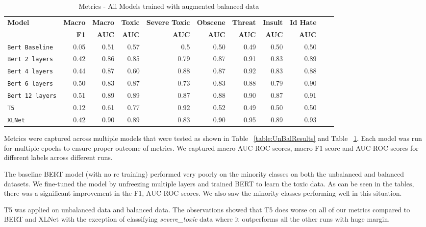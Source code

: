 \documentclass[11pt,a4paper]{article}
\begin{document}
\begin{table}
\centering
\begin{tabular}{lrrrrrrrrrr}
\hline
\textbf{Model} & \textbf{Macro} & \textbf{Macro} & \textbf{Toxic} & \textbf{Severe Toxic} & \textbf{Obscene} & \textbf{Threat} & \textbf{Insult} & \textbf{Id Hate}
\\
\textbf{ } & \textbf{F1} & \textbf{AUC} & \textbf{AUC} & \textbf{AUC} & \textbf{AUC} & \textbf{AUC} & \textbf{AUC} & \textbf{AUC}\\
\hline
\verb|Bert Baseline| & 0.05 & 0.51 & 0.57 & 0.5 & 0.50 & 0.49 & 0.50 & 0.50 \\
\verb|Bert 2 layers| & 0.42 & 0.86 & 0.85 & 0.79 & 0.87 & 0.91 & 0.83 & 0.89 \\
\verb|Bert 4 layers| & 0.44 & 0.87 & 0.60 & 0.88 & 0.87 & 0.92 & 0.83 & 0.88 \\
\verb|Bert 6 layers| & 0.50 & 0.83 & 0.87 & 0.73 & 0.83 & 0.88 & 0.79 & 0.90 \\
\verb|Bert 12 layers| & 0.51 & 0.89 & 0.89 & 0.87 & 0.88 & 0.90 & 0.87 & 0.91 \\
\verb|T5| & 0.12 & 0.61 & 0.77 & 0.92 & 0.52 & 0.49 & 0.50 & 0.50 \\
\verb|XLNet| & 0.42 & 0.90 & 0.89 & 0.83 & 0.90 & 0.95 & 0.89 & 0.93 \\
\hline
\end{tabular}
\caption{Metrics - All Models trained with augmented balanced data}
\label{table:BalResults}
\end{table}

Metrics were captured across multiple models that were tested as shown in Table ~\ref{table:UnBalResults} and Table ~\ref{table:BalResults}. Each model was run for multiple epochs to ensure proper outcome of metrics. We captured macro AUC-ROC scores, macro F1 score and AUC-ROC scores for different labels across different runs.

The baseline BERT model (with no re training) performed very poorly on the minority classes on both the unbalanced and balanced datasets. We fine-tuned the model by unfreezing multiple layers and trained BERT to learn the toxic data. As can be seen in the tables, there was a significant improvement in the F1, AUC-ROC scores. We also saw the minority classes performing well in this situation.

T5 was applied on unbalanced data and balanced data. The observations showed that T5 does worse on all of our metrics compared to BERT and XLNet with the exception of classifying \emph{severe\_toxic} data where it outperforms all the other runs with huge margin.
\end{document}
